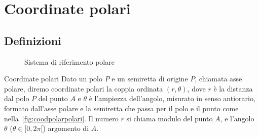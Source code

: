 \chapter{Coordinate polari}
\section{Definizioni}
\label{Cha:CoordinatePolariTrig}
\begin{figure} %
	\centering
	
	\caption{Sistema di riferimento polare}\label{fig:coodpolarpolari}
\end{figure}
\begin{definizionet}{Coordinate polari}{}
Dato un polo $P$ e un semiretta di origine $P$, chiamata asse polare, diremo coordinate polari la coppia ordinata $(r,\theta)$, dove $r$ è la distanza dal polo $P$ del punto $A$ e $\theta$ è l'ampiezza dell'angolo, misurato in senso antiorario, formato dall'asse polare e la semiretta che passa per il polo e il punto come nella~\vref{fig:coodpolarpolari}. Il numero $r$ si chiama modulo del punto $A$, e l'angolo $\theta$ ($\theta\in[0,2\pi[$) argomento di $A$. 
\end{definizionet}

